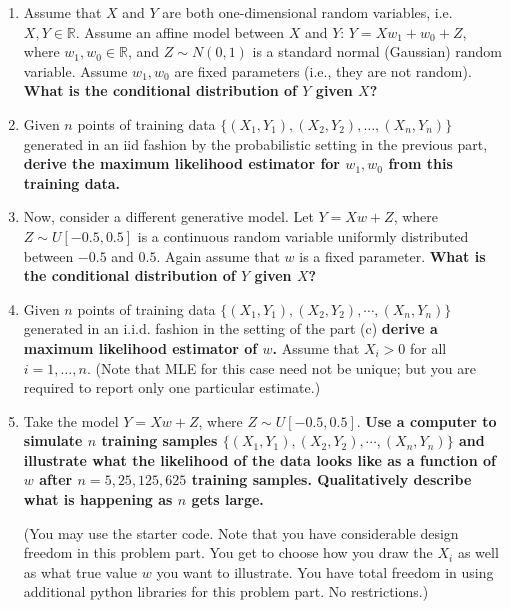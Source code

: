 \documentclass{article}\usepackage[utf8]{inputenc}\usepackage[margin=0.4cm,top=0.4cm,bottom=0.4cm]{geometry}\usepackage[usenames,dvipsnames,svgnames,table]{xcolor}
\begin{document}
\begin{enumerate}
\item Assume that $X$ and $Y$ are both one-dimensional random variables, i.e. $X, Y \in \mathbb{R}$. Assume an affine model between $X$ and $Y$: $Y=Xw_1+w_0+Z$, where $w_1, w_0 \in \mathbb{R}$, and $Z \sim N(0,1)$ is a standard normal (Gaussian) random variable.  Assume $w_1, w_0$ are fixed parameters (i.e., they are not random).  {\bf What is the conditional distribution of $Y$ given $X$?}
\BeginSolution

\EndSolution
\item Given $n$ points of training data $\{(X_1,Y_1),(X_2,Y_2),\ldots, (X_n,Y_n)\}$ generated in an iid fashion by the probabilistic setting in the previous part, {\bf derive the maximum likelihood estimator for $w_1,w_0$ from this training data.} 
\BeginSolution

\EndSolution
\item Now, consider a different generative model. Let $Y=Xw+Z$, where $Z \sim U[-0.5,0.5]$ is a continuous random variable uniformly distributed between $-0.5$ and $0.5$.  Again assume that $w$ is a fixed parameter. {\bf What is the conditional distribution of $Y$ given $X$?} 
\BeginSolution

\EndSolution
\item Given $n$ points of training data $\{(X_1,Y_1),(X_2,Y_2),\cdots, (X_n,Y_n)\}$ generated in an i.i.d. fashion in the setting of the part (c) {\bf derive a maximum likelihood estimator of $w$.} Assume that $X_i > 0$ for all $i = 1, \ldots, n$. (Note that MLE for this case need not be unique;  but you are required to report only one particular estimate.)
\BeginSolution

\EndSolution
\item Take the model $Y=Xw +Z$, where $Z \sim U[-0.5,0.5]$. {\bf Use a computer to simulate $n$ training samples $\{(X_1,Y_1),(X_2,Y_2),\cdots, (X_n,Y_n)\}$ and illustrate what the likelihood of the data looks like as a function of $w$ after $n=5, 25, 125, 625$ training samples. Qualitatively describe what is happening as $n$ gets large.}  
\vspace{4pt}

\noindent (You may use the starter code. Note that you have considerable design freedom in this problem part. You get to choose how you draw the $X_i$ as well as what true value $w$ you want to illustrate. You have total freedom in using additional python libraries for this problem part. No restrictions.) 
\BeginSolution


\end{enumerate}
\end{document}
